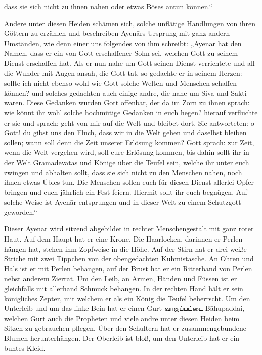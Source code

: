 \documentclass{article}
\newcommand{\TamilText}[1]{\texttamil{#1}}
\newcommand{\tam}[1]{\TamilText{#1}}
\begin{document}
dass sie sich nicht zu ihnen nahen oder etwas Böses antun können.“

Andere unter diesen Heiden schämen sich, solche unflätige Handlungen von ihren Göttern zu erzählen und beschreiben Ayen\={a}rs Ursprung mit ganz andern Umständen, wie denn einer uns folgendes von ihm schreibt: „Ayen\={a}r hat den Namen, dass er ein von Gott erschaffener Sohn sei, welchen Gott zu seinem Dienst erschaffen hat. Als er nun nahe um Gott seinen Dienst verrichtete und all die Wunder mit Augen ansah, die Gott tat, so gedachte er in seinem Herzen: sollte ich nicht ebenso wohl wie Gott solche Welten und Menschen schaffen können? und solches gedachten auch einige andre, die nahe um Siva und Sakti waren. Diese Gedanken wurden Gott offenbar, der da im Zorn zu ihnen sprach: wie könnt ihr wohl solche hochmütige Gedanken in euch hegen? hierauf verfluchte er sie und sprach: geht von mir auf die Welt und bleibet dort. Sie antworteten: o Gott! du gibst uns den Fluch, dass wir in die Welt gehen und daselbst bleiben sollen; wann soll denn die Zeit unserer Erlösung kommen? Gott sprach: zur Zeit, wenn die Welt vergehen wird, soll eure Erlösung kommen, bis dahin sollt ihr in der Welt Gr\={a}mad\={e}vatas und Könige über die Teufel sein, welche ihr unter euch zwingen und abhalten sollt, dass sie sich nicht zu den Menschen nahen, noch ihnen etwas Übles tun. Die Menschen sollen euch für diesen Dienst allerlei Opfer bringen und euch jährlich ein Fest feiern. Hiermit sollt ihr euch begnügen. Auf solche Weise ist Ayen\={a}r entsprungen und in dieser Welt zu einem Schutzgott geworden.“

Dieser Ayen\={a}r wird sitzend abgebildet in rechter Menschengestalt mit ganz roter Haut. Auf dem Haupt hat er eine Krone. Die Haarlocken, darinnen er Perlen hängen hat, stehen ihm Zopfweise in die Höhe. Auf der Stirn hat er drei weiße Striche mit zwei Tippchen von der obengedachten Kuhmistasche. An Ohren und Hals ist er mit Perlen behangen, auf der Brust hat er ein Ritterband von Perlen nebst anderem Zierrat. Um den Leib, an Armen, Händen und Füssen ist er gleichfalls mit allerhand Schmuck behangen. In der rechten Hand hält er sein königliches Zepter, mit welchem er als ein König die Teufel beherrscht. Um den Unterleib und um das linke Bein hat er einen Gurt \tam{வாகுப்பட்டை} B\={a}hupaddai, welchen Gurt auch die Propheten und viele andre unter diesen Heiden beim Sitzen zu gebrauchen pflegen. Über den Schultern hat er zusammengebundene Blumen herunterhängen. Der Oberleib ist bloß, um den Unterleib hat er ein buntes Kleid.
\end{document}
